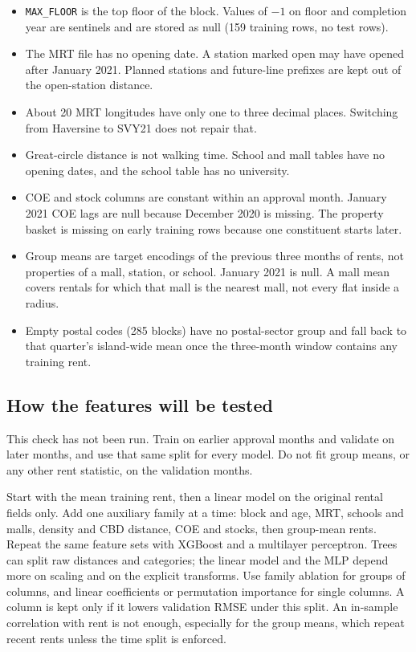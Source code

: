 \documentclass[10pt]{article}
\begin{document}
\begin{itemize}
\item \texttt{MAX\_FLOOR} is the top floor of the block. Values of $-1$ on floor and completion year are sentinels and are stored as null (159 training rows, no test rows).
\item The MRT file has no opening date. A station marked open may have opened after January 2021. Planned stations and future-line prefixes are kept out of the open-station distance.
\item About 20 MRT longitudes have only one to three decimal places. Switching from Haversine to SVY21 does not repair that.
\item Great-circle distance is not walking time. School and mall tables have no opening dates, and the school table has no university.
\item COE and stock columns are constant within an approval month. January 2021 COE lags are null because December 2020 is missing. The property basket is missing on early training rows because one constituent starts later.
\item Group means are target encodings of the previous three months of rents, not properties of a mall, station, or school. January 2021 is null. A mall mean covers rentals for which that mall is the nearest mall, not every flat inside a radius.
\item Empty postal codes (285 blocks) have no postal-sector group and fall back to that quarter's island-wide mean once the three-month window contains any training rent.
\end{itemize}

\subsection{How the features will be tested}

This check has not been run.
Train on earlier approval months and validate on later months, and use that same split for every model.
Do not fit group means, or any other rent statistic, on the validation months.

Start with the mean training rent, then a linear model on the original rental fields only.
Add one auxiliary family at a time: block and age, MRT, schools and malls, density and CBD distance, COE and stocks, then group-mean rents.
Repeat the same feature sets with XGBoost and a multilayer perceptron.
Trees can split raw distances and categories; the linear model and the MLP depend more on scaling and on the explicit transforms.
Use family ablation for groups of columns, and linear coefficients or permutation importance for single columns.
A column is kept only if it lowers validation RMSE under this split.
An in-sample correlation with rent is not enough, especially for the group means, which repeat recent rents unless the time split is enforced.
\end{document}
